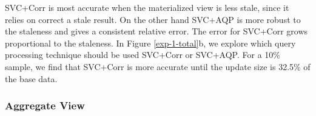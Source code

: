 SVC+Corr is most accurate when the materialized view is less stale, since it relies on correct a stale result.
On the other hand SVC+AQP is more robust to the staleness and gives a consistent relative error.
The error for SVC+Corr grows proportional to the staleness.
In Figure \ref{exp-1-total}b, we explore which query processing technique should be used SVC+Corr or SVC+AQP.
For a 10\% sample, we find that SVC+Corr is more accurate until the update size is 32.5\% of the base data.




\subsubsection{Aggregate View}
\label{exp-datacube}

